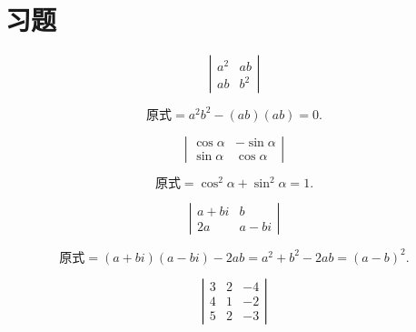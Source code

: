 \section{习题}

\begin{li}
  $$
  \left|
    \begin{array}{rr}
      a^2&ab\\
      ab&b^2
    \end{array}
  \right|
  $$
\end{li}
\begin{jie}
$$
\mbox{原式} = a^2b^2-(ab)(ab) = 0.
$$    
\end{jie}


\begin{li}
  $$
  \left|
    \begin{array}{rr}
      \cos \alpha& -\sin \alpha\\
      \sin \alpha&  \cos \alpha
    \end{array}
  \right|
  $$
\end{li}

\begin{jie}
$$
\mbox{原式} = \cos^2\alpha + \sin^2 \alpha= 1.
$$    
\end{jie}


\begin{li}
  $$
  \left|
    \begin{array}{cc}
      a+bi&b\\
      2a&a-bi
    \end{array}
  \right|
  $$      
\end{li}

\begin{jie}
$$
\mbox{原式} = (a+bi)(a-bi)-2ab = a^2+b^2-2ab=(a-b)^2.
$$ 
\end{jie}



\begin{li}
  $$
  \left|
    \begin{array}{rrr}
      3&2&-4\\
      4&1&-2\\
      5&2&-3
    \end{array}
  \right|
  $$
\end{li}


